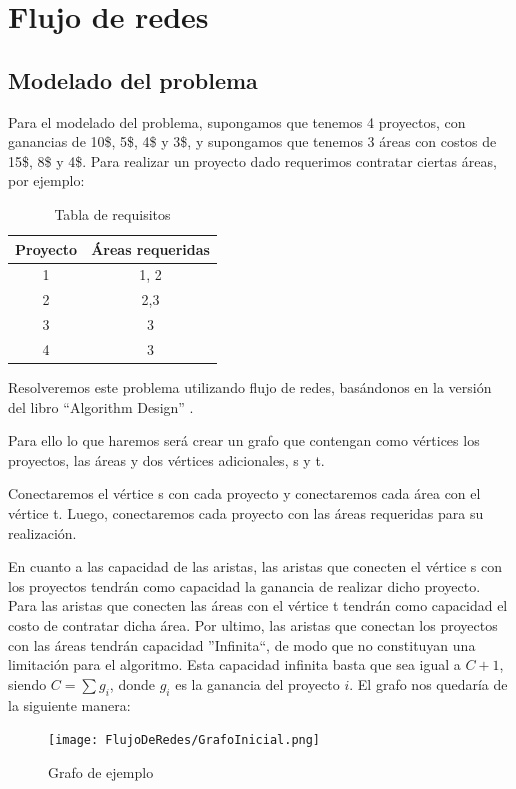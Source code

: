 \newpage
\section{Flujo de redes}
\subsection{Modelado del problema}
Para el modelado del problema, supongamos que tenemos 4 proyectos, con ganancias de 10\$, 5\$, 4\$ y 3\$, y supongamos que tenemos 3 áreas con costos de 15\$, 8\$ y 4\$.
Para realizar un proyecto dado requerimos contratar ciertas áreas, por ejemplo:
\begin{table}[H]
\centering
\begin{tabular}{|c|c|}
\hline
Proyecto & Áreas requeridas \\ \hline
1        & 1, 2             \\ \hline
2        & 2,3              \\ \hline
3        & 3                \\ \hline
4        & 3                \\ \hline
\end{tabular}
\caption{Tabla de requisitos}
\end{table}

Resolveremos este problema utilizando flujo de redes, basándonos en la versión del libro ``Algorithm Design'' \cite{ALGORITHMDESIGN}.

Para ello lo que haremos será crear un grafo que contengan como vértices los proyectos, las áreas y dos vértices adicionales, s y t.

Conectaremos el vértice s con cada proyecto y conectaremos cada área con el vértice t.
Luego, conectaremos cada proyecto con las áreas requeridas para su realización.

En cuanto a las capacidad de las aristas, las aristas que conecten el vértice s con los proyectos tendrán como capacidad la ganancia de realizar dicho proyecto. Para las aristas que conecten las áreas 
con el vértice t tendrán como capacidad el costo de contratar dicha área. Por ultimo, las aristas que conectan los proyectos con las áreas tendrán capacidad ''Infinita``, de modo que no constituyan 
una limitación para el algoritmo. Esta capacidad infinita basta que sea igual a $ C + 1 $, siendo $ C = \sum g_i $, donde $g_i$ es la ganancia del proyecto $i$.
\newpage
El grafo nos quedaría de la siguiente manera:

\begin{figure}[H]
\centering
\texttt{[image: FlujoDeRedes/GrafoInicial.png]}
\caption{Grafo de ejemplo}
\end{figure}

